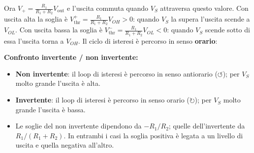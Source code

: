 Ora $V_+ = \frac{R_1}{R_1+R_2} V_{\text{out}}$ e l'uscita commuta quando $V_S$ attraversa questo valore. Con uscita alta la soglia è $V_{\text{thr}}^+ = \frac{R_1}{R_1+R_2} V_{OH} > 0$: quando $V_S$ la supera l'uscita scende a $V_{OL}$. Con uscita bassa la soglia è $V_{\text{thr}}^- = \frac{R_1}{R_1+R_2} V_{OL} < 0$: quando $V_S$ scende sotto di essa l'uscita torna a $V_{OH}$. Il ciclo di isteresi è percorso in senso \textbf{orario}:

\begin{fitcenter}
\end{fitcenter}

\begin{important}
\textbf{Confronto invertente / non invertente:}
\begin{itemize}
    \item \textbf{Non invertente}: il loop di isteresi è percorso in senso antiorario ($\circlearrowleft$); per $V_S$ molto grande l'uscita è alta.
    \item \textbf{Invertente}: il loop di isteresi è percorso in senso orario ($\circlearrowright$); per $V_S$ molto grande l'uscita è bassa.
    \item Le soglie del non invertente dipendono da $-R_1/R_2$; quelle dell'invertente da $R_1/(R_1+R_2)$. In entrambi i casi la soglia positiva è legata a un livello di uscita e quella negativa all'altro.
\end{itemize}
\end{important}

